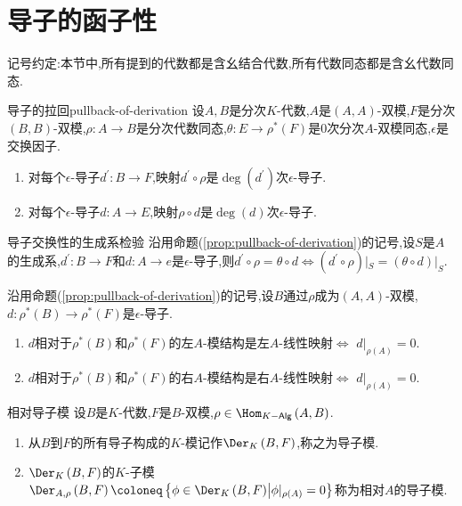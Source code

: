 \section{导子的函子性}

记号约定:本节中,所有提到的代数都是含幺结合代数,所有代数同态都是含幺代数同态.

\begin{proposition}{导子的拉回}{pullback-of-derivation}
	设$A,B$是分次$K$-代数,$A$是$\left(A,A\right)$-双模,$F$是分次$\left(B,B\right)$-双模,$\rho:A\to B$是分次代数同态,$\theta:E\to\rho^{\ast}\left(F\right)$是$0$次分次$A$-双模同态,$\epsilon$是交换因子.
	\begin{enumerate}
		\item 对每个$\epsilon$-导子$d^{\prime}:B\to F$,映射$d^{\prime}\circ\rho$是$\deg\left(d^{\prime}\right)$次$\epsilon$-导子.
		\item 对每个$\epsilon$-导子$d:A\to E$,映射$\rho\circ d$是$\deg\left(d\right)$次$\epsilon$-导子.
	\end{enumerate}
\end{proposition}

\begin{corollary}{导子交换性的生成系检验}{}
	沿用命题(\ref{prop:pullback-of-derivation})的记号,设$S$是$A$的生成系,$d^{\prime}:B\to F$和$d:A\to e$是$\epsilon$-导子,则$d^{\prime}\circ\rho=\theta\circ d\iff \left(d^{\prime}\circ\rho\right)|_{S}=\left(\theta\circ d\right)|_{S}$.
\end{corollary}

\begin{proposition}{}{}
	沿用命题(\ref{prop:pullback-of-derivation})的记号,设$B$通过$\rho$成为$\left(A,A\right)$-双模,$d:\rho^{\ast}\left(B\right)\to\rho^{\ast}\left(F\right)$是$\epsilon$-导子.
	\begin{enumerate}
		\item $d$相对于$\rho^{\ast}\left(B\right)$和$\rho^{\ast}\left(F\right)$的左$A$-模结构是左$A$-线性映射$\iff$ $d|_{\rho\left(A\right)}=0$.
		\item $d$相对于$\rho^{\ast}\left(B\right)$和$\rho^{\ast}\left(F\right)$的右$A$-模结构是右$A$-线性映射$\iff$ $d|_{\rho\left(A\right)}=0$.
	\end{enumerate}
\end{proposition}

\begin{definition}{相对导子模}{}
	设$B$是$K$-代数,$F$是$B$-双模,$\rho\in\Hom_{K-\mathsf{Alg}}\left(A,B\right)$.
	\begin{enumerate}
		\item 从$B$到$F$的所有导子构成的$K$-模记作$\Der_{K}\left(B,F\right)$,称之为导子模.
		\item $\Der_{K}\left(B,F\right)$的$K$-子模$\Der_{A,\rho}\left(B,F\right)\coloneq\left\{\phi\in\Der_{K}\left(B,F\right)\middle|\phi|_{\rho\left(A\right)}=0\right\}$称为相对$A$的导子模.
	\end{enumerate}
\end{definition}

